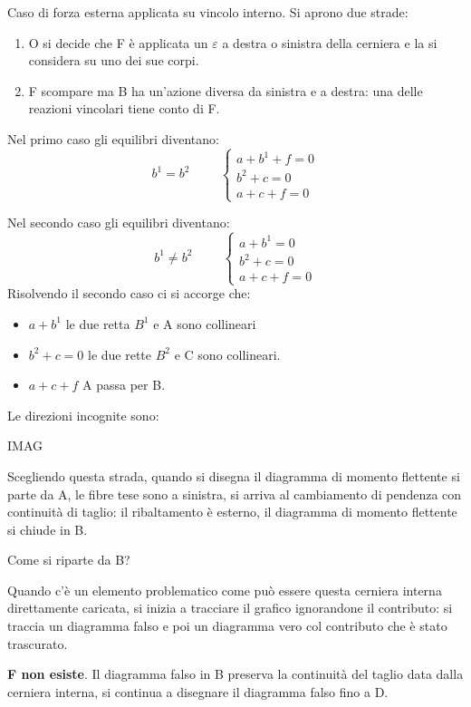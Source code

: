 \documentclass{article}
\begin{document}
\begin{adjustwidth}{2in}{}
Caso di forza esterna applicata su vincolo interno. Si aprono due strade:
\begin{enumerate}[I]
	\item O si decide che F è applicata un $\varepsilon$ a destra o sinistra della cerniera e la si considera su uno dei sue corpi.
	\item F scompare ma B ha un'azione diversa da sinistra e a destra: una delle reazioni vincolari tiene conto di F. 
\end{enumerate}
Nel primo caso gli equilibri diventano:
\[ b^1=b^2  \hspace{1cm} \begin{cases}
	a+b^1+f = 0 \\
	b^2+c=0 \\
	a+c+f = 0
\end{cases}  \]

Nel secondo caso gli equilibri diventano:
\[b^1\ne b^2  \hspace{1cm}\begin{cases}
	a+b^1 = 0 \\
b^2+c=0 \\
	a+c+f = 0
\end{cases} \]
Risolvendo il secondo caso ci si accorge che: 
\begin{itemize}
	\item $ a+b^1 $ le due retta $ B^1 $ e A sono collineari
	\item $b^2+c=0$ le due rette $ B^2 $ e C sono collineari.
	\item $a+c+f$ A passa per B.
\end{itemize}
Le direzioni incognite sono:

IMAG

Scegliendo questa strada, quando si disegna il diagramma di momento flettente si parte da A, le fibre tese sono a sinistra, si arriva al cambiamento di pendenza con continuità di taglio: il ribaltamento è esterno, il diagramma di momento flettente si chiude in B.\newline 

Come si riparte da B?

Quando c'è un elemento problematico come può essere questa cerniera interna direttamente caricata, si inizia a tracciare il grafico ignorandone il contributo: si traccia un diagramma falso e poi un diagramma vero col contributo che è stato trascurato.  \newline 

\textbf{F non esiste}. Il diagramma falso in B preserva la continuità del taglio data dalla cerniera interna, si continua a disegnare il diagramma falso fino a D.


\end{adjustwidth}
\end{document}
